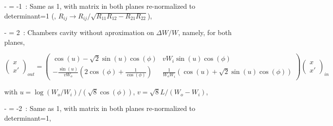 {\begin{itemize}
\begin{equation}
      \left(  \begin{array}{c} x \\ x'  \end{array} \right)_{out} = 
      \left(  \begin{array}{cc} 
            \sqrt(W_i/W_o) &  L_{cav}  \times \sqrt(W_i/W_o) \\
           0. & \sqrt(W_i/W_o)
      \end{array} \right)
      \left(  \begin{array}{c} x \\ x'  \end{array} \right)_{in} 
\end{equation}

\noindent with   $W_i$, $ W_o$ respectively the incoming and outgoing kinetic energies, $\phi$  the particle phase at the cavity. 

\item[-]  = -1~: Same as 1, with matrix in both planes re-normalized  to determinant=1 
(\ie, $R_{ij} \rightarrow R_{ij} /\sqrt{R_{11}R_{12} - R_{21}R_{22}}$),

\item[-]  = 2~: Chambers cavity without aproximation on  $\Delta W/W$, namely, for both planes, 

\begin{equation}
      \left(  \begin{array}{c} x \\ x'  \end{array} \right)_{out} = 
      \left(  \begin{array}{cc} 
            \cos(u)-\sqrt{2} \sin(u) \cos(\phi) &   v W_i  \sin(u) \cos(\phi)  \\
            -\frac{\textstyle{\sin(u)}}{\textstyle{v W_o}} (2 \cos(\phi)+ \frac{\textstyle{1}}{\textstyle{\cos(\phi)}}) & \frac{\textstyle{1}}{\textstyle{W_o W_i}} (\cos(u)+\sqrt{2} \sin(u) \cos(\phi))
      \end{array} \right)
      \left(  \begin{array}{c} x \\ x'  \end{array} \right)_{in} 
\end{equation}

\noindent with   $u=\log(W_o/W_i)/(\sqrt{8} \cos(\phi))$, $v=\sqrt{8} L/(W_o-W_i)$, 

\item[-]  = -2~: Same as 1, with matrix in both planes re-normalized  to determinant=1,


\end{itemize}}
